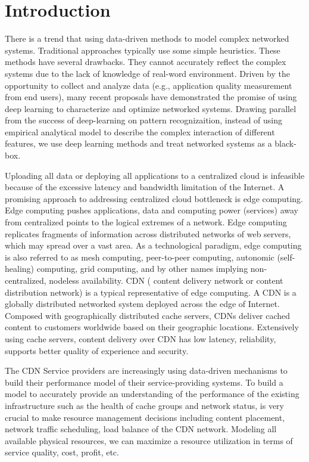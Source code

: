 \documentclass[5p]{elsarticle}
\begin{document}
\section{Introduction}
There is a trend \cite{Jiang2017Pytheas:Exploration-Exploitation} \cite{Mao2017NeuralPensieve} \cite{Li2017} \cite{JiangVIA:Selection} \cite{GaoMachineOptimization} that using data-driven methods to model complex networked systems. Traditional approaches typically use some simple heuristics. These methods have several drawbacks. They cannot accurately reflect the complex systems due to the lack of knowledge of real-word environment. Driven by the opportunity to collect and analyze data (e.g., application quality measurement from end users), many recent proposals have demonstrated the promise of using deep learning to characterize and optimize networked systems. Drawing parallel from the success of deep-learning on pattern recognizaition, instead of using empirical analytical model to describe the complex interaction of different features, we use deep learning methods and treat networked systems as a black-box.

Uploading all data  or deploying all applications to a centralized cloud  is infeasible because of the excessive latency and bandwidth limitation of the Internet. A promising approach to addressing centralized cloud bottleneck is edge computing. Edge computing pushes applications, data and computing power (services) away from centralized points to the logical extremes of a network. Edge computing replicates fragments of information across distributed networks of web servers, which may spread over a vast area. As a technological paradigm, edge computing is also referred to as mesh computing, peer-to-peer computing, autonomic (self-healing) computing, grid computing, and by other names implying non-centralized, nodeless availability\cite{Edge}. CDN ( content delivery network or content distribution network) is a typical representative of edge computing. A CDN is a globally distributed networked system deployed across the edge of Internet. Composed with geographically distributed cache servers, CDNs deliver cached content  to  customers  worldwide  based  on their geographic locations. Extensively  using  cache  servers,  content  delivery over  CDN  has  low  latency, reliability, supports better quality of experience and security.

The CDN Service providers are increasingly using data-driven mechanisms to build their performance model of their service-providing systems. To build a model to accurately provide an understanding of the performance of the existing infrastructure such as the health of cache groups and network status, is very crucial to make resource management decisions including content placement, network traffic scheduling, load balance of the CDN network. Modeling all available physical resources, we can maximize a resource utilization in terms of service quality, cost, profit, etc.
\end{document}

